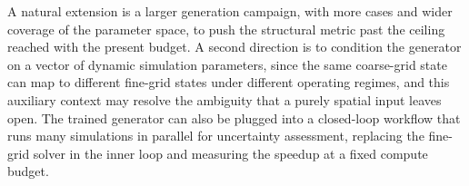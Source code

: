 A natural extension is a larger generation campaign, with more cases and wider coverage of the parameter space, to push the structural metric past the ceiling reached with the present budget. A second direction is to condition the generator on a vector of dynamic simulation parameters, since the same coarse-grid state can map to different fine-grid states under different operating regimes, and this auxiliary context may resolve the ambiguity that a purely spatial input leaves open. The trained generator can also be plugged into a closed-loop workflow that runs many simulations in parallel for uncertainty assessment, replacing the fine-grid solver in the inner loop and measuring the speedup at a fixed compute budget.
